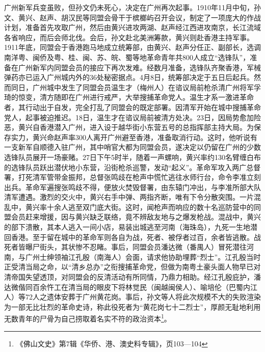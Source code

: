 广州新军兵变虽败，但孙文仍未死心，决定在广州再次起事。1910年11月中旬，孙文、黄兴、赵声、胡汉民等同盟会骨干于槟榔屿召开会议，制定了一项庞大的作战计划，准备首先攻取广州，然后由黄兴进攻两湖、赵声经江西进攻南京，长江流域各省响应，而后会师北伐。会后，孙文赴北美洲筹款，黄兴则赴香港主持军事。1911年底，同盟会于香港跑马地成立统筹部，由黄兴、赵声分任正、副部长，选调南洋粤、闽侨及粤、桂、闽、苏、皖、蜀等地革命青年共800人成立“选锋队”，准备在广州新军内同盟会员的接应下再次发难。经数月准备，选锋队齐聚香港，军械弹药亦已运入广州城内外的36处秘密据点。4月8日，统筹部决定于五日后起兵。然而同日，广州城中发生了同盟会员温生才（梅州人）在谘议局前枪杀清广州将军孚琦的惊变，清方随即在广州进行戒严，大举搜捕革命党人。温生才系一激进革命者，其行动出于自发，完全打乱了同盟会的既定部署。因清军开始在城中搜捕革命党人，起事被迫推迟。18日，温生才在谘议局前被清方处决。23日，因局势愈加险恶，黄兴自香港潜入广州，进入设于越华街小东营五号的总指挥部主持大局。为保存实力，黄兴命赵声率300人离开广州避至香港，准备取消行动。这时，他听说有一支新军自顺德入驻广州，其中哨官大都为同盟会员，遂决定以仍留在广州的少数选锋队员展开一场豪赌。27日下午5时半，随着一声螺响，黄兴率约130名臂缠白布的选锋队员跃出潜伏地小东营，沿街枪杀巡警，发动“起义”。革命军攻入两广总督署，打死清军管带金振邦，总督张鸣歧在枪声中慌忙逃往水师行台，命令李准立刻出兵。革命军遍搜张鸣歧不得，便放火焚毁督署，由东辕门冲出，与李准所部大队清军遭遇。激烈的交火中，黄兴右手中弹、两指齐断，唯有下令分散突围。一片混乱中，黄兴率十余人逃至双门底大街。这时，闻枪声而响应的数十名巡防营中的同盟会员赶来增援，因与黄兴缺乏联络，竟不辨敌友地与之爆发枪战。混战中，黄兴的部下溃散，其本人逃入一间小店，易装出城逃至河南（海珠岛），九死一生地潜回香港。至于留在城中的革命军则各自为战，死者、被俘者过百，余者皆逃散。战死者皆曝尸街头，其状惨不忍睹。事后，同盟会员潘达微（番禺人）冒死潜往河南，与广州士绅领袖江孔殷（南海人）会面，请求他协助埋葬“烈士”。江孔殷当时正受清当局之命，以“清乡总办”之衔搜捕革命党，但做为南粤土豪头面人物早已对清帝国失望透顶，对同盟会的反清活动有所同情，乃鼎力相助。经江孔殷庇护，潘达微偕同百余忤工在清当局的眼皮下将林觉民（闽越闽侯人）、喻培伦（巴蜀内江人）等72人之遗体安葬于广州黄花岗。事后，孙文等人将此次规模不大的失败渲染为一部无比壮烈的革命史诗，称此役死者为“黄花岗七十二烈士”，厚颜无耻地利用无数青年的尸骨为自己捞取着名实不符的政治资本\footnote{《佛山文史》第7辑《华侨、港、澳史料专辑》，页103—104}。

